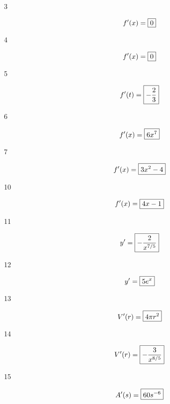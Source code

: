 \documentclass[letterpaper, landscape]{exam}
\begin{document}
  \begin{description}

    \item[3] 
      \[
        f'(x) = \boxed{ 0 } \\
      \]

    \item[4] 
      \[
        f'(x) = \boxed{ 0 } \\
      \]

    \item[5] 
      \[
        f'(t) = \boxed{ - \frac{2}{3} } \\
      \]

    \item[6] 
      \[
        f'(x) = \boxed{ 6 x^7 } \\
      \]

    \item[7] 
      \[
        f'(x) = \boxed{ 3x^2 - 4 } \\
      \]



    \item[10] 
      \[
        f'(x) = \boxed{ 4x - 1 } \\
      \]

    \item[11] 
      \[
        y' = \boxed{ -\frac{2}{x^{7/5}} } \\
      \]

    \item[12] 
      \[
        y' = \boxed{ 5e^x } \\
      \]

    \item[13] 
      \[
        V'(r) = \boxed{ 4 \pi r^2 } \\
      \]

    \item[14] 
      \[
        V'(r) = \boxed{ -\frac{3}{x^{8/5}} } \\
      \]

    \item[15] 
      \[
        A'(s) = \boxed{ 60 s^{-6} } \\
      \]


\end{description}
\end{document}
